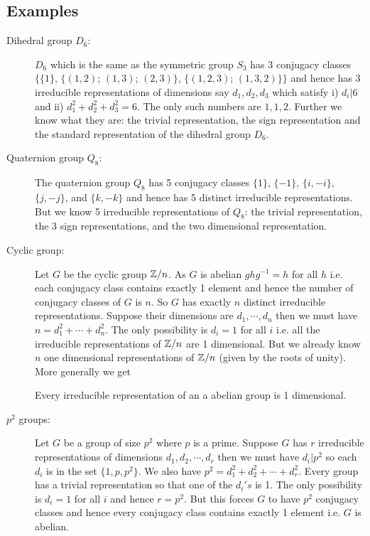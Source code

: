 \subsection{Examples}
\begin{description}
	\item[Dihedral group $D_6$:]
	$D_6$ which is the same as the symmetric group $S_3$ has 3 conjugacy classes $\{ \{1 \}$, $\{ (1,2)$; $(1,3)$; $(2,3) \}$, $\{(1,2,3)$; $(1,3,2)\} \}$ and hence has 3 irreducible representations of dimensions say $d_1, d_2, d_3$ which satisfy i) $d_i | 6$ and ii) $d_1^2 + d_2^2 + d_3^2 = 6$. The only such numbers are $1,1,2$. Further we know what they are: the trivial representation, the sign representation and the standard representation of the dihedral group $D_6$.

	\item[Quaternion group $Q_8$:]
	The quaternion group $Q_8$ has 5 conjugacy classes $\{ 1\}$, $\{ -1\}$, $\{i, -i\}$, $\{ j, -j\}$, and $\{ k, -k\}$ and hence has 5 distinct irreducible representations. But we know 5 irreducible representations of $Q_8$: the trivial representation, the 3 sign representations, and the two dimensional representation.

	\item[Cyclic group:]
	Let $G$ be the cyclic group $\mathbb{Z}/n$. As $G$ is abelian $ghg^{-1} = h$ for all $h$ i.e. each conjugacy class contains exactly 1 element and hence the number of conjugacy classes of $G$ is $n$. So $G$ has exactly $n$ distinct irreducible representations. Suppose their dimensions are $d_1, \cdots, d_n$ then we must have $n = d_1^2 + \cdots + d_n^2$. The only possibility is $d_i = 1$ for all $i$ i.e. all the irreducible representations of $\mathbb{Z}/n$ are 1 dimensional. But we already know $n$ one dimensional representations of $\mathbb{Z}/n$ (given by the roots of unity). More generally we get

	\begin{proposition}
		Every irreducible representation of an a abelian group is 1 dimensional.
	\end{proposition}

	\item[$p^2$ groups:]
	Let $G$ be a group of size $p^2$ where $p$ is a prime. Suppose $G$ has $r$ irreducible representations of dimensions $d_1, d_2, \cdots, d_r$ then we must have $d_i | p^2$ so each $d_i$ is in the set $\{ 1, p , p^2 \}$. We also have $p^2 = d_1 ^2 + d_2 ^2 + \cdots + d_r^2$. Every group has a trivial representation so that one of the $d_i's$ is 1. The only possibility is $d_i = 1$ for all $i$ and hence $r = p^2$. But this forces $G$ to have $p^2$ conjugacy classes and hence every conjugacy class contains exactly 1 element i.e. $G$ is abelian.


\end{description}
